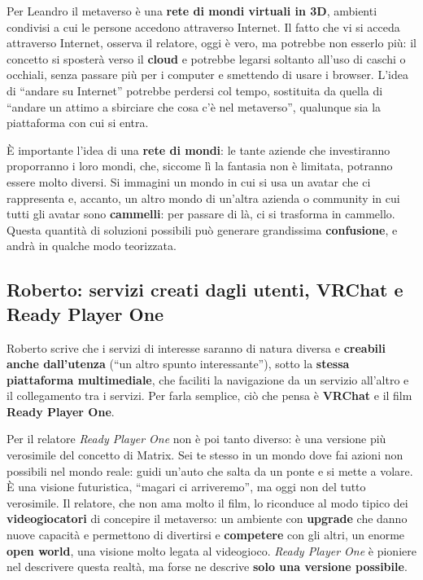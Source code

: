Per Leandro il metaverso è una \textbf{rete di mondi virtuali in 3D}, ambienti
condivisi a cui le persone accedono attraverso Internet. Il fatto che vi si
acceda attraverso Internet, osserva il relatore, oggi è vero, ma potrebbe non
esserlo più: il concetto si sposterà verso il \textbf{cloud} e potrebbe legarsi
soltanto all'uso di caschi o occhiali, senza passare più per i computer e
smettendo di usare i browser. L'idea di ``andare su Internet'' potrebbe perdersi
col tempo, sostituita da quella di ``andare un attimo a sbirciare che cosa c'è
nel metaverso'', qualunque sia la piattaforma con cui si entra.

È importante l'idea di una \textbf{rete di mondi}: le tante aziende che
investiranno proporranno i loro mondi, che, siccome lì la fantasia non è
limitata, potranno essere molto diversi. Si immagini un mondo in cui si usa un
avatar che ci rappresenta e, accanto, un altro mondo di un'altra azienda o
community in cui tutti gli avatar sono \textbf{cammelli}: per passare di là, ci
si trasforma in cammello. Questa quantità di soluzioni possibili può generare
grandissima \textbf{confusione}, e andrà in qualche modo teorizzata.

\subsection{Roberto: servizi creati dagli utenti, VRChat e Ready Player One}

Roberto scrive che i servizi di interesse saranno di natura diversa e
\textbf{creabili anche dall'utenza} (``un altro spunto interessante''), sotto la
\textbf{stessa piattaforma multimediale}, che faciliti la navigazione da un
servizio all'altro e il collegamento tra i servizi. Per farla semplice, ciò che
pensa è \textbf{VRChat} e il film \textbf{Ready Player One}.

Per il relatore \emph{Ready Player One} non è poi tanto diverso: è una versione
più verosimile del concetto di Matrix. Sei te stesso in un mondo dove fai azioni
non possibili nel mondo reale: guidi un'auto che salta da un ponte e si mette a
volare. È una visione futuristica, ``magari ci arriveremo'', ma oggi non del tutto
verosimile. Il relatore, che non ama molto il film, lo riconduce al modo tipico
dei \textbf{videogiocatori} di concepire il metaverso: un ambiente con
\textbf{upgrade} che danno nuove capacità e permettono di divertirsi e
\textbf{competere} con gli altri, un enorme \textbf{open world}, una visione
molto legata al videogioco. \emph{Ready Player One} è pioniere nel descrivere
questa realtà, ma forse ne descrive \textbf{solo una versione possibile}.

